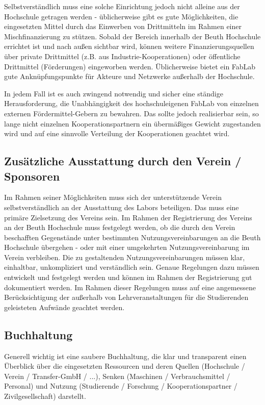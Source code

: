\documentclass[parskip=half,headsepline,footsepline,titlepage]{scrartcl}
\begin{document}
Selbstverständlich muss eine solche Einrichtung jedoch nicht alleine aus der Hochschule getragen werden - üblicherweise gibt es gute Möglichkeiten, die eingesetzten Mittel durch das Einwerben von Drittmitteln im Rahmen einer Mischfinanzierung zu stützen.
Sobald der Bereich innerhalb der Beuth Hochschule errichtet ist und nach außen sichtbar wird, können weitere Finanzierungsquellen über private Drittmittel (z.B. aus Industrie-Kooperationen) oder öffentliche Drittmittel (Förderungen) eingeworben werden. Üblicherweise bietet ein FabLab gute Anknüpfungspunkte für Akteure und Netzwerke außerhalb der Hochschule.

In jedem Fall ist es auch zwingend notwendig und sicher eine ständige Herausforderung, die Unabhängigkeit des hochschuleigenen FabLab von einzelnen externen Fördermittel-Gebern zu bewahren. Das sollte jedoch realisierbar sein, so lange nicht einzelnen Kooperationspartnern ein übermäßiges Gewicht zugestanden wird und auf eine sinnvolle Verteilung der Kooperationen geachtet wird.


\subsection{Zusätzliche Ausstattung durch den Verein / Sponsoren}
Im Rahmen seiner Möglichkeiten muss sich der unterstützende Verein selbstverständlich an der Ausstattung des Labors beteiligen. Das muss eine primäre Zielsetzung des Vereins sein.
Im Rahmen der Registrierung des Vereins an der Beuth Hochschule muss festgelegt werden, ob die durch den Verein beschafften Gegenstände unter bestimmten Nutzungsvereinbarungen an die Beuth Hochschule übergehen - oder mit einer umgekehrten Nutzungsvereinbarung im Verein verbleiben. Die zu gestaltenden Nutzungsvereinbarungen müssen klar, einhaltbar, unkompliziert und verständlich sein.
Genaue Regelungen dazu müssen entwickelt und festgelegt werden und können im Rahmen der Registrierung gut dokumentiert werden. Im Rahmen dieser Regelungen muss auf eine angemessene Berücksichtigung der außerhalb von Lehrveranstaltungen für die Studierenden geleisteten Aufwände geachtet werden.


\subsection{Buchhaltung}
Generell wichtig ist eine saubere Buchhaltung, die klar und transparent einen Überblick über die eingesetzten Ressourcen und deren Quellen (Hochschule / Verein / Transfer-GmbH / ...), Senken (Maschinen / Verbrauchsmittel / Personal) und Nutzung (Studierende / Forschung / Kooperationspartner / Zivilgesellschaft) darstellt.
\end{document}
